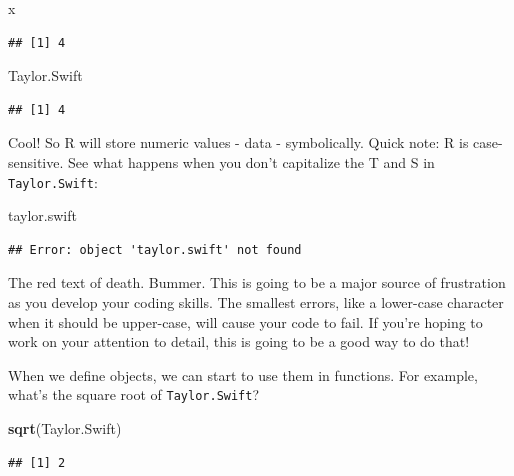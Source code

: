 \documentclass[
]{book}
\newenvironment{Shaded}{\begin{snugshade}}{\end{snugshade}}
\newcommand{\FunctionTok}[1]{\textcolor[rgb]{0.13,0.29,0.53}{\textbf{#1}}}
\newcommand{\NormalTok}[1]{#1}
\begin{document}
\begin{Shaded}
\begin{Highlighting}[]
\NormalTok{x}
\end{Highlighting}
\end{Shaded}

\begin{verbatim}
## [1] 4
\end{verbatim}

\begin{Shaded}
\begin{Highlighting}[]
\NormalTok{Taylor.Swift}
\end{Highlighting}
\end{Shaded}

\begin{verbatim}
## [1] 4
\end{verbatim}

Cool! So R will store numeric values - data - symbolically. Quick note: R is case-sensitive. See what happens when you don't capitalize the T and S in \texttt{Taylor.Swift}:

\begin{Shaded}
\begin{Highlighting}[]
\NormalTok{taylor.swift}
\end{Highlighting}
\end{Shaded}

\begin{verbatim}
## Error: object 'taylor.swift' not found
\end{verbatim}

The red text of death. Bummer. This is going to be a major source of frustration as you develop your coding skills. The smallest errors, like a lower-case character when it should be upper-case, will cause your code to fail. If you're hoping to work on your attention to detail, this is going to be a good way to do that!

When we define objects, we can start to use them in functions. For example, what's the square root of \texttt{Taylor.Swift}?

\begin{Shaded}
\begin{Highlighting}[]
\FunctionTok{sqrt}\NormalTok{(Taylor.Swift)}
\end{Highlighting}
\end{Shaded}

\begin{verbatim}
## [1] 2
\end{verbatim}
\end{document}
